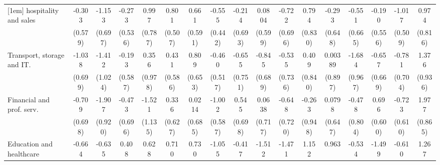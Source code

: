 {\begin{tabular}{l*{16}{c}}
[1em]
hospitality and sales&      -0.303         &      -1.153         &      -0.273         &       0.997         &       0.801         &       0.661         &      -0.555         &      -0.214         &      0.0804         &      -0.722         &       0.794         &      -0.293         &      -0.551         &      -0.190         &      -1.017\sym{*}  &       0.974         \\
                    &     (0.579)         &     (0.697)         &     (0.536)         &     (0.787)         &     (0.507)         &     (0.591)         &     (0.442)         &     (0.693)         &     (0.599)         &     (0.696)         &     (0.830)         &     (0.648)         &     (0.665)         &     (0.556)         &     (0.509)         &     (0.816)         \\
[1em]
Transport, storage and IT.&      -1.038         &      -1.412         &      -0.193         &       0.356         &       0.431         &       0.809         &      -0.460         &      -0.655         &      -0.845         &      -0.535         &       0.409         &     0.00389         &      -1.684         &      -0.657         &      -0.781         &       1.376         \\
                    &     (0.699)         &     (1.024)         &     (0.587)         &     (0.978)         &     (0.586)         &     (0.653)         &     (0.517)         &     (0.751)         &     (0.689)         &     (0.736)         &     (0.840)         &     (0.897)         &     (0.967)         &     (0.669)         &     (0.704)         &     (0.936)         \\
[1em]
Financial and prof. serv.&      -0.709         &      -1.907\sym{*}  &      -0.473         &      -1.521         &       0.336         &      0.0214         &      -1.002         &       0.545         &      0.0638         &      -0.648         &      -0.263         &      0.0798         &      -0.478         &       0.696         &      -0.723         &       1.977\sym{*}  \\
                    &     (0.698)         &     (0.920)         &     (0.696)         &     (1.135)         &     (0.627)         &     (0.685)         &     (0.587)         &     (0.698)         &     (0.717)         &     (0.720)         &     (0.948)         &     (0.647)         &     (0.804)         &     (0.600)         &     (0.610)         &     (0.865)         \\
[1em]
Education and healthcare&      -0.664         &      -0.635         &       0.408         &       0.628         &       0.710         &       0.730         &      -1.055         &      -0.417         &      -1.512         &      -1.471         &       1.152         &       0.963         &      -0.534         &      -1.499         &      -0.610         &       1.267         \\

\end{tabular}}
